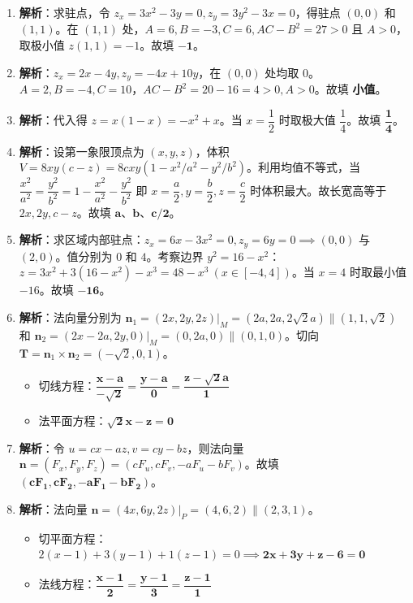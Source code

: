 \documentclass[lang=cn,11pt]{elegantbook}
\begin{document}
\begin{solution}
\begin{enumerate}
  \item \textbf{解析}：求驻点，令 $z_x=3x^2-3y=0, z_y=3y^2-3x=0$，得驻点 $(0,0)$ 和 $(1,1)$。在 $(1,1)$ 处，$A=6, B=-3, C=6, AC-B^2 = 27 > 0$ 且 $A>0$，取极小值 $z(1,1)=-1$。故填 $\mathbf{-1}$。
  \item \textbf{解析}：$z_x = 2x-4y, z_y = -4x+10y$，在 $(0,0)$ 处均取 $0$。$A=2, B=-4, C=10$，$AC-B^2 = 20-16=4>0, A>0$。故填 \textbf{小值}。
  \item \textbf{解析}：代入得 $z=x(1-x)=-x^2+x$。当 $x=\dfrac{1}{2}$ 时取极大值 $\dfrac{1}{4}$。故填 $\mathbf{\dfrac{1}{4}}$。
  \item \textbf{解析}：设第一象限顶点为 $(x,y,z)$，体积 $V=8xy(c-z)=8cxy(1-x^2/a^2-y^2/b^2)$。利用均值不等式，当 $\dfrac{x^2}{a^2} = \dfrac{y^2}{b^2} = 1 - \dfrac{x^2}{a^2} - \dfrac{y^2}{b^2}$ 即 $x=\dfrac{a}{2}, y=\dfrac{b}{2}, z=\dfrac{c}{2}$ 时体积最大。故长宽高等于 $2x, 2y, c-z$。故填 $\mathbf{a}$、$\mathbf{b}$、$\mathbf{c/2}$。
  \item \textbf{解析}：求区域内部驻点：$z_x=6x-3x^2=0, z_y=6y=0 \implies (0,0)$ 与 $(2,0)$。值分别为 $0$ 和 $4$。考察边界 $y^2=16-x^2$：$z=3x^2+3(16-x^2)-x^3 = 48-x^3 \ (x \in [-4,4])$。当 $x=4$ 时取最小值 $-16$。故填 $\mathbf{-16}$。
  \item \textbf{解析}：法向量分别为 $\boldsymbol n_1 = (2x, 2y, 2z)|_M = (2a, 2a, 2\sqrt{2}a) \parallel (1,1,\sqrt{2})$ 和 $\boldsymbol n_2 = (2x-2a, 2y, 0)|_M = (0, 2a, 0) \parallel (0,1,0)$。切向 $\boldsymbol T = \boldsymbol n_1 \times \boldsymbol n_2 = (-\sqrt{2}, 0, 1)$。
  \begin{itemize}
    \item 切线方程：$\mathbf{\dfrac{x-a}{-\sqrt{2}} = \dfrac{y-a}{0} = \dfrac{z-\sqrt{2}a}{1}}$
    \item 法平面方程：$\mathbf{\sqrt{2}x - z = 0}$
  \end{itemize}
  \item \textbf{解析}：令 $u=cx-az, v=cy-bz$，则法向量 $\boldsymbol n = (F_x, F_y, F_z) = (c F_u, c F_v, -a F_u - b F_v)$。故填 $\mathbf{(c F_1, c F_2, -a F_1 - b F_2)}$。
  \item \textbf{解析}：法向量 $\boldsymbol n = (4x, 6y, 2z)|_P = (4, 6, 2) \parallel (2, 3, 1)$。
  \begin{itemize}
    \item 切平面方程：$2(x-1)+3(y-1)+1(z-1)=0 \implies \mathbf{2x+3y+z-6=0}$
    \item 法线方程：$\mathbf{\dfrac{x-1}{2} = \dfrac{y-1}{3} = \dfrac{z-1}{1}}$
  \end{itemize}
\end{enumerate}
\end{solution}
\end{document}
